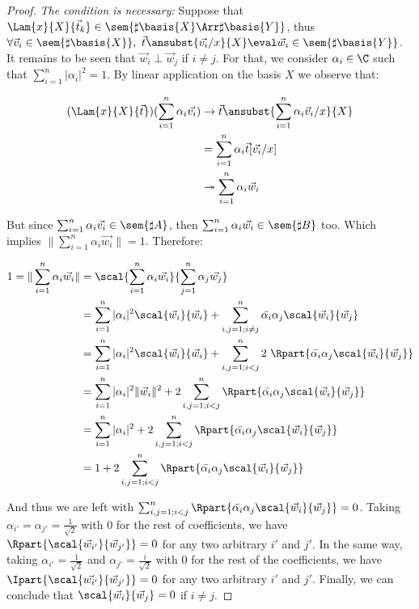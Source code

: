 \begin{proof}
  \textit{The condition is necessary:} Suppose that $\Lam{x}{X}{\vec t_k}\in\sem{\sharp\basis{X}\Arr\sharp\basis{Y}}$, thus $\forall \vec v_i\in\sem{\sharp\basis{X}},\ \vec{t}\ansubst{\vec{v_i}/x}{X}\eval\vec w_i\in\sem{\sharp\basis{Y}}$. It remains to be seen that $\vec w_i \perp \vec w_j$ if $i\neq j$. For that, we consider $\alpha_i\in\C$ such that $\sum_{i=1}^n |\alpha_i|^2 = 1$. By linear application on the basis $X$ we observe that:

  \begin{align*}
    (\Lam{x}{X}{\vec{t}})(\sum_{i=1}^n \alpha_i \vec{v_i}) &\to \vec t\ansubst{\sum_{i=1}^n \alpha_i \vec v_i/x}{X}\\
    &= \sum_{i=1}^{n} \alpha_i \vec{t}[\vec{v_i}/x]\\ 
    &\twoheadrightarrow \sum_{i=1}^n \alpha_i \vec w_i
  \end{align*}

  But since $\sum_{i=1}^n \alpha_i \vec{v_i}\in\sem{\sharp A}$, then $\sum_{i=1}^n \alpha_i \vec{w_i}\in\sem{\sharp B}$ too. Which implies $\|\sum_{i=1}^n \alpha_i \vec{w_i}\|=1$. Therefore:

  \begin{align*}
    1 = \|\sum_{i=1}^n \alpha_i \vec{w_i}\| &= \scal{\sum_{i=1}^n \alpha_i \vec{w_i}}{\sum_{j=1}^n \alpha_j \vec{w_j}}\\
    &=\sum_{i=1}^n |\alpha_i|^2 \scal{\vec w_i}{\vec w_i } + \sum_{i,j=1; i\neq j}^n \bar{\alpha_i}\alpha_j \scal{\vec w_i}{\vec w_j}\\
    &=\sum_{i=1}^n |\alpha_i|^2 \scal{\vec w_i}{\vec w_i } + \sum_{i,j=1; i<j}^n 2~\Rpart{\bar{\alpha_i}\alpha_j \scal{\vec w_i}{\vec w_j}}\\
    &=\sum_{i=1}^n |\alpha_i|^2 \|\vec w_i\|^2 + 2\sum_{i,j=1; i<j}^n \Rpart{\bar{\alpha_i}\alpha_j \scal{\vec w_i}{\vec w_j}}\\
    &=\sum_{i=1}^n |\alpha_i|^2 + 2\sum_{i,j=1; i<j}^n\Rpart{\bar{\alpha_i}\alpha_j \scal{\vec w_i}{\vec w_j}}\\
    &= 1 + 2\sum_{i,j=1; i<j}^n \Rpart{\bar{\alpha_i}\alpha_j \scal{\vec w_i}{\vec w_j}}
  \end{align*}

  And thus we are left with $\sum_{i,j=1; i<j}^n \Rpart{\bar{\alpha_i}\alpha_j \scal{\vec w_i}{\vec w_j}} = 0$. Taking $\alpha_{i'} = \alpha_{j'} = \frac{1}{\sqrt{2}}$ with $0$ for the rest of coefficients, we have $\Rpart{\scal{\vec w_{i'}}{\vec w_{j'}}} = 0$ for any two arbitrary $i'$ and $j'$. In the same way, taking $\alpha_{i'} = \frac{1}{\sqrt{2}}$ and $\alpha_{j'}=\frac{i}{\sqrt{2}}$ with $0$ for the rest of the coefficients, we have $\Ipart{\scal{\vec{w_{i'}}}{\vec w_{j'}}} = 0$ for any two arbitrary $i'$ and $j'$. Finally, we can conclude that $\scal{\vec w_i}{\vec w_j}=0$ if $i\neq j$.


\end{proof}
